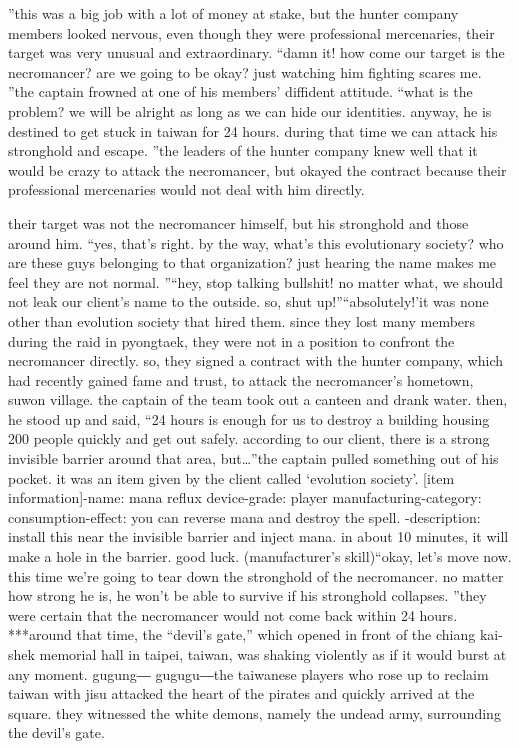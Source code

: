 ”this was a big job with a lot of money at stake, but the hunter company members looked nervous, even though they were professional mercenaries, their target was very unusual and extraordinary.
“damn it! how come our target is the necromancer? are we going to be okay? just watching him fighting scares me.
”the captain frowned at one of his members’ diffident attitude.
“what is the problem? we will be alright as long as we can hide our identities.
 anyway, he is destined to get stuck in taiwan for 24 hours.
 during that time we can attack his stronghold and escape.
”the leaders of the hunter company knew well that it would be crazy to attack the necromancer, but okayed the contract because their professional mercenaries would not deal with him directly.

their target was not the necromancer himself, but his stronghold and those around him.
“yes, that’s right.
 by the way, what’s this evolutionary society? who are these guys belonging to that organization? just hearing the name makes me feel they are not normal.
”“hey, stop talking bullshit! no matter what, we should not leak our client’s name to the outside.
 so, shut up!”“absolutely!’it was none other than evolution society that hired them.
 since they lost many members during the raid in pyongtaek, they were not in a position to confront the necromancer directly.
 so, they signed a contract with the hunter company, which had recently gained fame and trust, to attack the necromancer’s hometown, suwon village.
the captain of the team took out a canteen and drank water.
then, he stood up and said, “24 hours is enough for us to destroy a building housing 200 people quickly and get out safely.
 according to our client, there is a strong invisible barrier around that area, but…”the captain pulled something out of his pocket.
 it was an item given by the client called ‘evolution society’.
[item information]-name: mana reflux device-grade: player manufacturing-category: consumption-effect: you can reverse mana and destroy the spell.
-description: install this near the invisible barrier and inject mana.
 in about 10 minutes, it will make a hole in the barrier.
 good luck.
 (manufacturer’s skill)“okay, let’s move now.
 this time we’re going to tear down the stronghold of the necromancer.
 no matter how strong he is, he won’t be able to survive if his stronghold collapses.
”they were certain that the necromancer would not come back within 24 hours.
***around that time, the “devil’s gate,” which opened in front of the chiang kai-shek memorial hall in taipei, taiwan, was shaking violently as if it would burst at any moment.
gugung― gugugu―the taiwanese players who rose up to reclaim taiwan with jisu attacked the heart of the pirates and quickly arrived at the square.
 they witnessed the white demons, namely the undead army, surrounding the devil’s gate.

